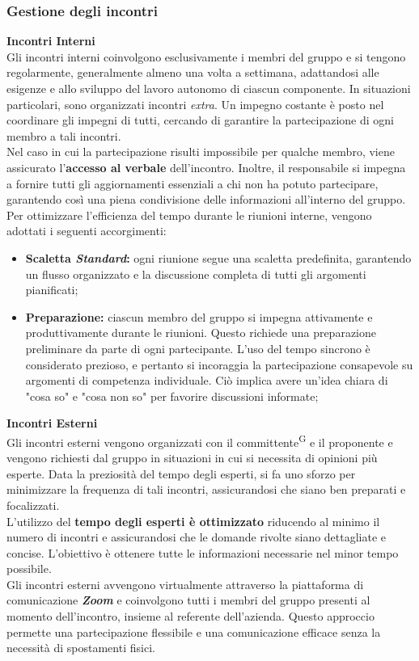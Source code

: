 \documentclass[5pt]{article}
\begin{document}
\subsubsection{Gestione degli incontri}
\textbf{Incontri Interni}\\
Gli incontri interni coinvolgono esclusivamente i membri del gruppo e si tengono regolarmente, generalmente almeno una volta a settimana, adattandosi alle esigenze e allo sviluppo del lavoro autonomo di ciascun componente. In situazioni particolari, sono organizzati incontri \textit{extra}. Un impegno costante è posto nel coordinare gli impegni di tutti, cercando di garantire la partecipazione di ogni membro a tali incontri.\\
Nel caso in cui la partecipazione risulti impossibile per qualche membro, viene assicurato l'\textbf{accesso al verbale} dell'incontro. Inoltre, il responsabile si impegna a fornire tutti gli aggiornamenti essenziali a chi non ha potuto partecipare, garantendo così una piena condivisione delle informazioni all'interno del gruppo.\\
Per ottimizzare l'efficienza del tempo durante le riunioni interne, vengono adottati i seguenti accorgimenti:
\begin{itemize}
    \item \textbf{Scaletta \textit{Standard}:} ogni riunione segue una scaletta predefinita, garantendo un flusso organizzato e la discussione completa di tutti gli argomenti pianificati;
    \item \textbf{Preparazione:} ciascun membro del gruppo si impegna attivamente e produttivamente durante le riunioni. Questo richiede una preparazione preliminare da parte di ogni partecipante. L'uso del tempo sincrono è considerato prezioso, e pertanto si incoraggia la partecipazione consapevole su argomenti di competenza individuale. Ciò implica avere un'idea chiara di "cosa so" e "cosa non so" per favorire discussioni informate;
\end{itemize}
\textbf{Incontri Esterni}\\
Gli incontri esterni vengono organizzati con il committente\textsuperscript{G} e il proponente e vengono richiesti dal gruppo in situazioni in cui si necessita di opinioni più esperte. Data la preziosità del tempo degli esperti, si fa uno sforzo per minimizzare la frequenza di tali incontri, assicurandosi che siano ben preparati e focalizzati.\\ 
L'utilizzo del \textbf{tempo degli esperti è ottimizzato} riducendo al minimo il numero di incontri e assicurandosi che le domande rivolte siano dettagliate e concise. L'obiettivo è ottenere tutte le informazioni necessarie nel minor tempo possibile.\\
Gli incontri esterni avvengono virtualmente attraverso la piattaforma di comunicazione \textbf{\textit{Zoom}} e coinvolgono tutti i membri del gruppo presenti al momento dell'incontro, insieme al referente dell'azienda. Questo approccio permette una partecipazione flessibile e una comunicazione efficace senza la necessità di spostamenti fisici.
\end{document}
